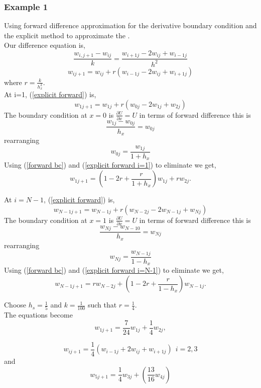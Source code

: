 \subsubsection{Example 1}
Using forward difference approximation for the derivative boundary condition
and the explicit method to approximate the .\\
Our difference equation is,
\[
\frac{w_{i,j+1}-w_{ij}}{k}=
\frac{w_{i+1j}-2w_{ij}+w_{i-1j}}{h^2}
\]
\begin{equation}
\label{explicit forward}
w_{ij+1}=w_{ij} +r(w_{i-1j}-2w_{ij}+w_{i+1j})
\end{equation}
where $r=\frac{k}{h^{2}_x}$.\\
At i=1, (\ref{explicit forward}) is,
\begin{equation}
\label{explicit forward i=1}
w_{1j+1}=w_{1j} +r(w_{0j}-2w_{1j}+w_{2j})
\end{equation}
The boundary condition at $x=0$ is $\frac{\partial U}{\partial x} = U$ in terms of
forward difference this is 
\[ \frac{w_{1j}-w_{0j}}{h_x} = w_{0j}\]
rearranging 
\begin{equation}
\label{forward bc}
w_{0j}=\frac{w_{1j}}{1+h_x}
\end{equation}
Using (\ref{forward bc}) and (\ref{explicit forward i=1}) to eliminate we get,
\[w_{1j+1} = \left(1-2r+\frac{r}{1+h_x}\right)w_{1j}+rw_{2j}.\]


At $i=N-1$, (\ref{explicit forward}) is,
\begin{equation}
\label{explicit forward i=N-1}
w_{N-1j+1}=w_{N-1j} +r(w_{N-2j}-2w_{N-1j}+w_{Nj})
\end{equation}
The boundary condition at $x=1$ is $\frac{\partial U}{\partial x} = U$ in terms of
forward difference this is 
\[ \frac{w_{Nj}-w_{N-10}}{h_x} = w_{Nj}\]
rearranging 
\begin{equation}
\label{forward bc}
w_{Nj}=\frac{w_{N-1j}}{1-h_x}
\end{equation}
Using (\ref{forward bc}) and (\ref{explicit forward i=N-1}) to eliminate we get,
\[w_{N-1j+1} = rw_{N-2j}+\left(1-2r+\frac{r}{1-h_x}\right)w_{N-1j}.\]




Choose $h_s=\frac{1}{5}$ and $k=\frac{1}{100}$ such that $r=\frac{1}{4}$.\\
The equations become
\[w_{1j+1}=\frac{7}{24}w_{1j}+\frac{1}{4}w_{2j}, \]

\[w_{ij+1}=\frac{1}{4}(w_{i-1j}+2w_{ij}+w_{i+1j}) \ \ i=2,3 \]
and
\[w_{5j+1}=\frac{1}{4}w_{3j}+(\frac{13}{16}w_{4j}) \]

